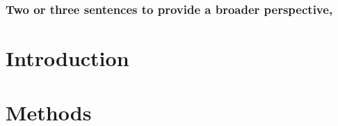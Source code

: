 \subsubsection{Two or three sentences to provide a broader perspective, }




\clearpage
\section{Introduction}







\section{Methods}






















































